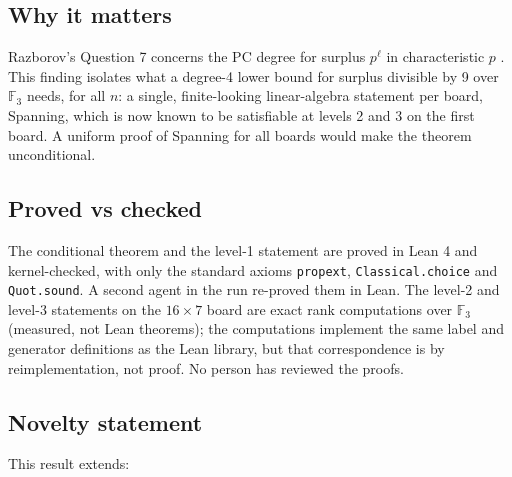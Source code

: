 \documentclass{article}
\begin{document}
\subsection*{Why it matters}

Razborov's Question 7 concerns the PC degree for surplus $p^\ell$ in characteristic $p$
\cite{razborov2001php}. This finding isolates what a degree-4 lower bound for surplus divisible by 9 over
$\mathbb F_3$ needs, for all $n$: a single, finite-looking linear-algebra statement per board, Spanning,
which is now known to be satisfiable at levels 2 and 3 on the first board. A uniform proof of Spanning
for all boards would make the theorem unconditional.

\subsection*{Proved vs checked}

The conditional theorem and the level-1 statement are proved in Lean 4 and kernel-checked, with only
the standard axioms \texttt{propext}, \texttt{Classical.choice} and \texttt{Quot.sound}. A second agent in the run re-proved
them in Lean. The level-2 and level-3 statements on the $16\times7$ board are exact rank computations
over $\mathbb F_3$ (measured, not Lean theorems); the computations implement the same label and
generator definitions as the Lean library, but that correspondence is by reimplementation, not proof.
No person has reviewed the proofs.

\subsection*{Novelty statement}

This result extends:
\end{document}

